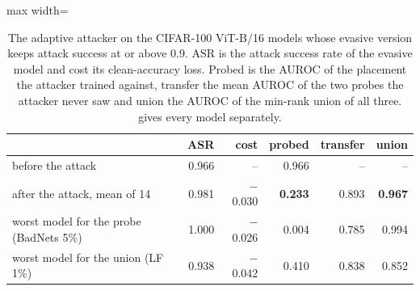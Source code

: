 \begin{table}[htbp]
\centering
\small
\caption{The adaptive attacker on the CIFAR-100 ViT-B/16 models whose evasive version keeps attack success at or above 0.9. ASR is the attack success rate of the evasive model and cost its clean-accuracy loss. Probed is the AUROC of the placement the attacker trained against, transfer the mean AUROC of the two probes the attacker never saw and union the AUROC of the min-rank union of all three.  gives every model separately.}
\label{tab:adaptive}
\begin{adjustbox}{max width=\linewidth}
\begin{tabular}{lrrrrr}
\toprule
 & ASR & cost & probed & transfer & union \\
\midrule
before the attack & 0.966 & -- & 0.966 & -- & -- \\
after the attack, mean of 14 & 0.981 & $-$0.030 & \textbf{0.233} & 0.893 & \textbf{0.967} \\
worst model for the probe (BadNets 5\%) & 1.000 & $-$0.026 & 0.004 & 0.785 & 0.994 \\
worst model for the union (LF 1\%) & 0.938 & $-$0.042 & 0.410 & 0.838 & 0.852 \\
\bottomrule
\end{tabular}
\end{adjustbox}
\end{table}
